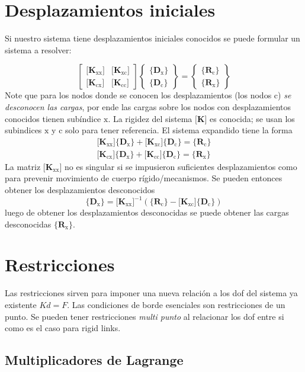 \documentclass[11pt, a4paper,titlepage]{article}
\newcommand{\Mme}[1]{\boldsymbol{[}\mathbf{#1} \boldsymbol{]}}
\newcommand{\Cme}[1]{\boldsymbol{\{ }\mathbf{#1} \boldsymbol{\}} }
\newcommand{\MK}{\Mme{K}}
\newcommand{\CDx}{\Cme{D_{\mathrm{x}}}}
\newcommand{\CDc}{\Cme{D_{\mathrm{c}}}}
\newcommand{\CRx}{\Cme{R_{\mathrm{x}}}}
\newcommand{\CRc}{\Cme{R_{\mathrm{c}}}}
\newcommand{\MKxx}{\Mme{K_{\mathrm{xx}}}}
\newcommand{\MKcc}{\Mme{K_{\mathrm{cc}}}}
\newcommand{\MKxc}{\Mme{K_{\mathrm{xc}}}}
\newcommand{\MKcx}{\Mme{K_{\mathrm{cx}}}}
\newcommand{\feaTP}{null.tex}
\begin{document}
\section{Desplazamientos iniciales} \label{sec:desplzImpuestos}
Si nuestro sistema tiene desplazamientos iniciales conocidos se puede formular un sistema a resolver:

\begin{equation}
	\begin{bmatrix}
	\MKxx & \MKxc \\
	\MKcx & \MKcc
	\end{bmatrix}
	\begin{Bmatrix}
	\CDx \\
	\CDc 
	\end{Bmatrix}
	=	\begin{Bmatrix}
	\CRc \\
	\CRx 
	\end{Bmatrix}
\end{equation} 
Note que para los nodos donde se conocen los desplazamientos (los nodos $\mathrm{c}$) \textit{se desconocen las cargas}, por ende las cargas sobre los nodos con desplazamientos conocidos tienen subíndice $\mathrm{x}$. La rigidez del sistema $\MK{}$ es conocida; se usan los subindices $\mathrm{x}$ y $\mathrm{c}$ solo para tener referencia. El sistema expandido tiene la forma
\begin{gather*} 
	\MKxx \CDx + \MKxc \CDc = \CRc \\
	\MKcx \CDx + \MKcc \CDc = \CRx 
\end{gather*}
La matriz $\MKxx$ no es singular si se impusieron suficientes desplazamientos como para prevenir movimiento de cuerpo rígido/mecanismos. Se pueden entonces obtener los desplazamientos desconocidos
\[
\CDx = \MKxx^{-1} \left( \CRc - \MKxc  \CDc \right)
\]
luego de obtener los desplazamientos desconocidas se puede obtener las cargas desconocidas $\CRx$.



\section{Restricciones}
Las restricciones sirven para imponer una nueva relación a los dof del sistema ya existente $Kd=F$. Las condiciones de borde esenciales son restricciones de un punto. Se pueden tener restricciones \textit{multi punto} al relacionar los dof entre si como es el caso para rigid links.

\subsection*{Multiplicadores de Lagrange}
\end{document}
